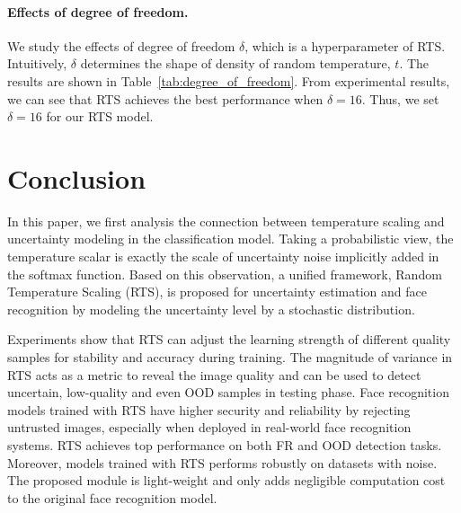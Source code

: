 \documentclass[letterpaper]{article} %
\begin{document}
\paragraph{Effects of degree of freedom.} We study the effects of degree of freedom $\delta$, which is a hyperparameter of RTS. Intuitively, $\delta$ determines the shape of density of random temperature, $t$. The results are shown in Table~\ref{tab:degree_of_freedom}. From experimental results, we can see that RTS achieves the best performance when $\delta = 16$. Thus, we set $\delta = 16$ for our RTS model.



\vspace{-0.79mm}
\section{Conclusion}
\label{sec:conclusion}

In this paper, we first analysis the connection between temperature scaling and uncertainty modeling in the classification model. Taking a probabilistic view, the temperature scalar is exactly the scale of uncertainty noise implicitly added in the softmax function. Based on this observation, a unified framework, Random Temperature Scaling (RTS), is proposed for uncertainty estimation and face recognition by modeling the uncertainty level by a stochastic distribution.

Experiments show that RTS can adjust the learning strength of different quality samples for stability and accuracy during training. The magnitude of variance in RTS acts as a metric to reveal the image quality and can be used to detect uncertain, low-quality and even OOD samples in testing phase.
Face recognition models trained with RTS have higher security and reliability by rejecting untrusted images, especially when deployed in real-world face recognition systems. RTS achieves top performance on both FR and OOD detection tasks. Moreover, models trained with RTS performs robustly on datasets with noise. The proposed module is light-weight and only adds negligible computation cost to the original face recognition model.


\vspace{-1.62mm}
\end{document}
